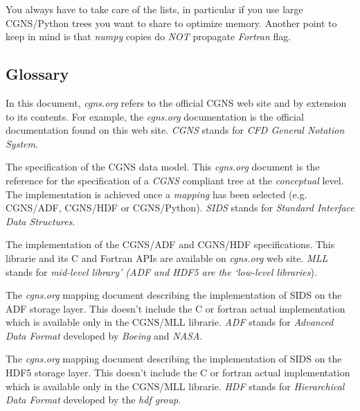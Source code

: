 \documentclass[a4paper,10pt,english]{sphinxmanual}
\begin{document}
You always have to take care of the lists, in particular if you use large
CGNS/Python trees you want to share to optimize memory. Another point to
keep in mind is that \emph{numpy} copies do \emph{NOT} propagate \emph{Fortran} flag.


\subsection{Glossary}
\label{sids-to-python:glossary}\begin{description}
\item[{\emph{cgns.org}}] \leavevmode{}\label{sids-to-python:term-cgns-org}
In this document, \emph{cgns.org} refers to the official CGNS web site and
by extension to its contents. For example, the \emph{cgns.org} documentation
is the official documentation found on this web site.
\emph{CGNS} stands for \emph{CFD General Notation System}.

\item[{CGNS/SIDS}] \leavevmode{}\label{sids-to-python:term-cgns-sids}
The specification of the CGNS data model. This \emph{cgns.org} document is
the reference for the specification of a \emph{CGNS} compliant tree at the
\emph{conceptual} level. The implementation is achieved once a \emph{mapping} has
been selected (e.g. CGNS/ADF, CGNS/HDF or CGNS/Python).
\emph{SIDS} stands for \emph{Standard Interface Data Structures}.

\item[{CGNS/MLL}] \leavevmode{}\label{sids-to-python:term-cgns-mll}
The implementation of the CGNS/ADF and CGNS/HDF specifications. This
librarie and its C and Fortran APIs are available on \emph{cgns.org} web site.
\emph{MLL} stands for \emph{mid-level library' (ADF and HDF5 are the
{}`low-level libraries}).

\item[{CGNS/ADF}] \leavevmode{}\label{sids-to-python:term-cgns-adf}
The \emph{cgns.org} mapping document describing the implementation of SIDS
on the ADF storage layer. This doesn't include the C or fortran actual
implementation which is available only in the CGNS/MLL librarie.
\emph{ADF} stands for \emph{Advanced Data Format} developed by \emph{Boeing} and \emph{NASA}.

\item[{CGNS/HDF}] \leavevmode{}\label{sids-to-python:term-cgns-hdf}
The \emph{cgns.org} mapping document describing the implementation of SIDS
on the HDF5 storage layer. This doesn't include the C or fortran actual
implementation which is available only in the CGNS/MLL librarie.
\emph{HDF} stands for \emph{Hierarchical Data Format} developed by the \emph{hdf group}.


\end{description}
\end{document}
